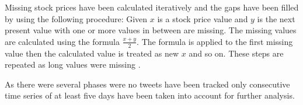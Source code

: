 \begin{description}
    Missing stock prices have been calculated iteratively and the gaps have been filled by using the following procedure:
    Given $x$ is a stock price value and $y$ is the next present value with one or more values in between are missing.
    The missing values are calculated using the formula $\frac{x+y}{2}$.
    The formula is applied to the first missing value then the calculated value is treated as new $x$ and so on.
    These steps are repeated as long values were missing
    \citep{Pagolu2016a}.

    As there were several phases were no tweets have been tracked only consecutive time series of at least five days have been taken into account for further analysis.

\end{description}